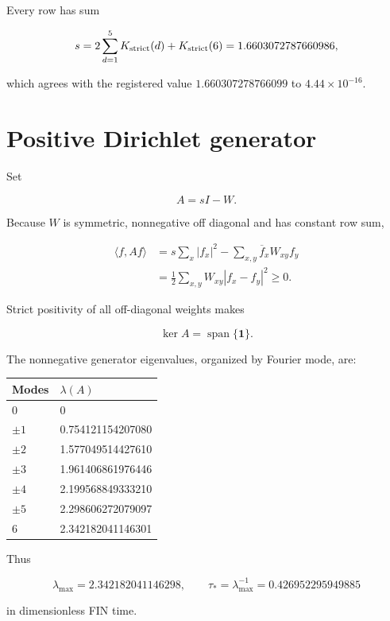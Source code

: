 \documentclass[11pt,a4paper,openany]{report}
\begin{document}
Every row has sum

\[
s=2\sum_{d=1}^{5}K_{\rm strict}(d)+K_{\rm strict}(6)
=1.6603072787660986,
\]

which agrees with the registered value \(1.660307278766099\) to \(4.44\times10^{-16}\).

\section{Positive Dirichlet generator}

Set

\[
A=sI-W.
\]

Because \(W\) is symmetric, nonnegative off diagonal and has constant row sum,

\[
\begin{aligned}
\langle f,Af\rangle
&=
s\sum_x|f_x|^2-\sum_{x,y}\overline f_xW_{xy}f_y\\
&=
\frac12\sum_{x,y}W_{xy}|f_x-f_y|^2
\geq0.
\end{aligned}
\]

Strict positivity of all off-diagonal weights makes

\[
\ker A=\operatorname{span}\{\mathbf 1\}.
\]

The nonnegative generator eigenvalues, organized by Fourier mode, are:

\begin{center}
\begingroup\small
\setlength{\tabcolsep}{3.5pt}
\renewcommand{\arraystretch}{1.16}
\begin{longtable}{@{}p{}p{}@{}}
\toprule
\textbf{Modes} & \textbf{\(\lambda(A)\)} \\
\midrule
\endhead
\(0\) & 0 \\
\(\pm1\) & 0.754121154207080 \\
\(\pm2\) & 1.577049514427610 \\
\(\pm3\) & 1.961406861976446 \\
\(\pm4\) & 2.199568849333210 \\
\(\pm5\) & 2.298606272079097 \\
\(6\) & 2.342182041146301 \\
\bottomrule
\end{longtable}
\endgroup
\end{center}

Thus

\[
\lambda_{\max}=2.342182041146298,
\qquad
\tau_*=\lambda_{\max}^{-1}=0.426952295949885
\]

in dimensionless FIN time.
\end{document}
